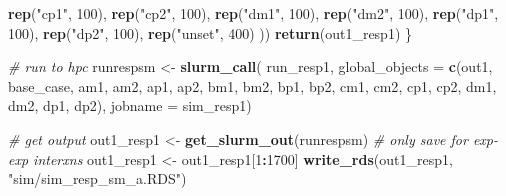 \documentclass[12pt, twoside]{amherstthesis}
\newenvironment{Shaded}{\begin{snugshade}}{\end{snugshade}}
\newcommand{\AttributeTok}[1]{\textcolor[rgb]{0.13,0.29,0.53}{#1}}
\newcommand{\CommentTok}[1]{\textcolor[rgb]{0.56,0.35,0.01}{\textit{#1}}}
\newcommand{\DecValTok}[1]{\textcolor[rgb]{0.00,0.00,0.81}{#1}}
\newcommand{\FunctionTok}[1]{\textcolor[rgb]{0.13,0.29,0.53}{\textbf{#1}}}
\newcommand{\NormalTok}[1]{#1}
\newcommand{\OtherTok}[1]{\textcolor[rgb]{0.56,0.35,0.01}{#1}}
\newcommand{\SpecialCharTok}[1]{\textcolor[rgb]{0.81,0.36,0.00}{\textbf{#1}}}
\newcommand{\StringTok}[1]{\textcolor[rgb]{0.31,0.60,0.02}{#1}}
\begin{document}
\begin{Shaded}
\begin{Highlighting}[]
      \FunctionTok{rep}\NormalTok{(}\StringTok{"cp1"}\NormalTok{, }\DecValTok{100}\NormalTok{), }
      \FunctionTok{rep}\NormalTok{(}\StringTok{"cp2"}\NormalTok{, }\DecValTok{100}\NormalTok{), }
      \FunctionTok{rep}\NormalTok{(}\StringTok{"dm1"}\NormalTok{, }\DecValTok{100}\NormalTok{), }
      \FunctionTok{rep}\NormalTok{(}\StringTok{"dm2"}\NormalTok{, }\DecValTok{100}\NormalTok{), }
      \FunctionTok{rep}\NormalTok{(}\StringTok{"dp1"}\NormalTok{, }\DecValTok{100}\NormalTok{), }
      \FunctionTok{rep}\NormalTok{(}\StringTok{"dp2"}\NormalTok{, }\DecValTok{100}\NormalTok{), }
      \FunctionTok{rep}\NormalTok{(}\StringTok{"unset"}\NormalTok{, }\DecValTok{400}\NormalTok{)}
\NormalTok{    )) }
  \FunctionTok{return}\NormalTok{(out1\_resp1)}
\NormalTok{\}}

\CommentTok{\# run to hpc}
\NormalTok{runrespsm }\OtherTok{\textless{}{-}} \FunctionTok{slurm\_call}\NormalTok{(}
\NormalTok{  run\_resp1, }
  \AttributeTok{global\_objects =} \FunctionTok{c}\NormalTok{(}\StringTok{\textquotesingle{}out1\textquotesingle{}}\NormalTok{, }\StringTok{\textquotesingle{}base\_case\textquotesingle{}}\NormalTok{, }
                     \StringTok{\textquotesingle{}am1\textquotesingle{}}\NormalTok{, }\StringTok{\textquotesingle{}am2\textquotesingle{}}\NormalTok{, }\StringTok{\textquotesingle{}ap1\textquotesingle{}}\NormalTok{, }\StringTok{\textquotesingle{}ap2\textquotesingle{}}\NormalTok{, }
                     \StringTok{\textquotesingle{}bm1\textquotesingle{}}\NormalTok{, }\StringTok{\textquotesingle{}bm2\textquotesingle{}}\NormalTok{, }\StringTok{\textquotesingle{}bp1\textquotesingle{}}\NormalTok{, }\StringTok{\textquotesingle{}bp2\textquotesingle{}}\NormalTok{, }
                     \StringTok{\textquotesingle{}cm1\textquotesingle{}}\NormalTok{, }\StringTok{\textquotesingle{}cm2\textquotesingle{}}\NormalTok{, }\StringTok{\textquotesingle{}cp1\textquotesingle{}}\NormalTok{, }\StringTok{\textquotesingle{}cp2\textquotesingle{}}\NormalTok{, }
                     \StringTok{\textquotesingle{}dm1\textquotesingle{}}\NormalTok{, }\StringTok{\textquotesingle{}dm2\textquotesingle{}}\NormalTok{, }\StringTok{\textquotesingle{}dp1\textquotesingle{}}\NormalTok{, }\StringTok{\textquotesingle{}dp2\textquotesingle{}}\NormalTok{),}
  \AttributeTok{jobname =} \StringTok{\textquotesingle{}sim\_resp1\textquotesingle{}}\NormalTok{)}

\CommentTok{\# get output}
\NormalTok{out1\_resp1 }\OtherTok{\textless{}{-}} \FunctionTok{get\_slurm\_out}\NormalTok{(runrespsm)}
\CommentTok{\# only save for exp{-}exp interxns}
\NormalTok{out1\_resp1 }\OtherTok{\textless{}{-}}\NormalTok{ out1\_resp1[}\DecValTok{1}\SpecialCharTok{:}\DecValTok{1700}\NormalTok{]}
\FunctionTok{write\_rds}\NormalTok{(out1\_resp1, }\StringTok{"sim/sim\_resp\_sm\_a.RDS"}\NormalTok{)}


\end{Highlighting}
\end{Shaded}
\end{document}
